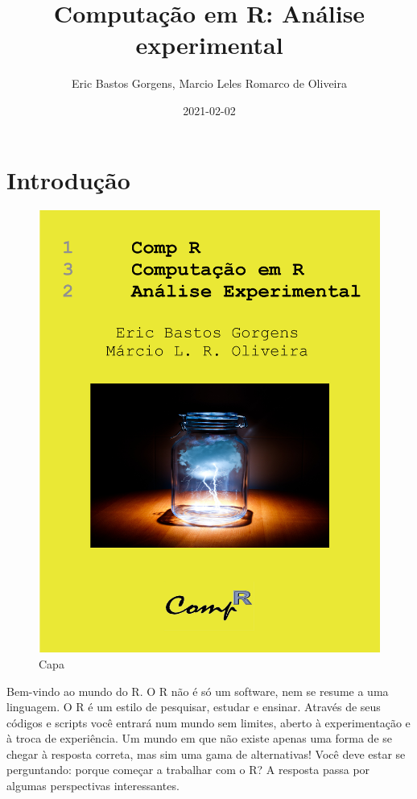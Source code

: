 \documentclass[
]{article}
\title{Computação em R: Análise experimental}
\author{Eric Bastos Gorgens, Marcio Leles Romarco de Oliveira}
\date{2021-02-02}
\begin{document}
\maketitle

{
\setcounter{tocdepth}{2}
\tableofcontents
}
\hypertarget{introduuxe7uxe3o}{%
\section{Introdução}\label{introduuxe7uxe3o}}

\begin{figure}
\centering
\includegraphics{./figuras/capa.png}
\caption{Capa}
\end{figure}

Bem-vindo ao mundo do R. O R não é só um software, nem se resume a uma linguagem. O R é um estilo de pesquisar, estudar e ensinar. Através de seus códigos e scripts você entrará num mundo sem limites, aberto à experimentação e à troca de experiência. Um mundo em que não existe apenas uma forma de se chegar à resposta correta, mas sim uma gama de alternativas! Você deve estar se perguntando: porque começar a trabalhar com o R? A resposta passa por algumas perspectivas interessantes.
\end{document}
